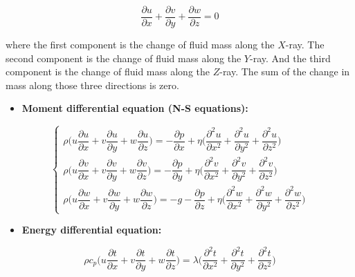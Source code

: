 \documentclass{mcmthesis}
\begin{document}
\begin{equation} \label{eq1}
\frac{\partial u}{\partial x} + \frac{\partial v}{\partial y} +\frac{\partial w}{\partial z} =0
\end{equation}

\noindent where the first component is the change of fluid mass along the $X$-ray. The second component is the change of fluid mass along the $Y$-ray. And the third component is the change of fluid mass along the $Z$-ray. The sum of the change in mass along those three directions is zero.

\begin{itemize}
\item {\bf Moment differential equation (N-S equations):}
\end{itemize}

\begin{equation} \label{eq2}
\left\{
\begin{array}{l} \!\!
\rho \Big(u \dfrac{\partial u}{\partial x} + v \dfrac{\partial u}{\partial y} + w\dfrac{\partial u}{\partial z} \Big) = -\dfrac{\partial p}{\partial x} + \eta \Big(\dfrac{\partial^2 u}{\partial x^2} + \dfrac{\partial^2 u}{\partial y^2} + \dfrac{\partial^2 u}{\partial z^2} \Big) \\[0.3cm]
\rho \Big(u \dfrac{\partial v}{\partial x} + v \dfrac{\partial v}{\partial y} + w\dfrac{\partial v}{\partial z} \Big) = -\dfrac{\partial p}{\partial y} + \eta \Big(\dfrac{\partial^2 v}{\partial x^2} + \dfrac{\partial^2 v}{\partial y^2} + \dfrac{\partial^2 v}{\partial z^2} \Big) \\[0.3cm]
\rho \Big(u \dfrac{\partial w}{\partial x} + v \dfrac{\partial w}{\partial y} + w\dfrac{\partial w}{\partial z} \Big) = -g-\dfrac{\partial p}{\partial z} + \eta \Big(\dfrac{\partial^2 w}{\partial x^2} + \dfrac{\partial^2 w}{\partial y^2} + \dfrac{\partial^2 w}{\partial z^2} \Big)  
\end{array}
\right.
\end{equation}

\begin{itemize}
\item {\bf Energy differential equation:}
\end{itemize}

\begin{equation} \label{eq3}
\rho c_p \Big( u\frac{\partial t}{\partial x} + v\frac{\partial t}{\partial y} + w\frac{\partial t}{\partial z} \Big) = \lambda \Big(\frac{\partial^2 t}{\partial x^2} + \frac{\partial^2 t}{\partial y^2} + \frac{\partial^2 t}{\partial z^2} \Big)
\end{equation}
\end{document}
